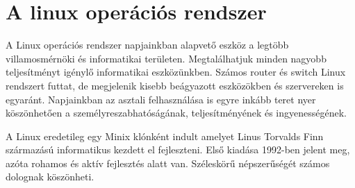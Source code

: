 \chapter{A linux operációs rendszer}

A Linux operációs rendszer napjainkban alapvető eszköz a legtöbb villamosmérnöki és informatikai területen. Megtalálhatjuk minden nagyobb teljesítményt igénylő informatikai eszközünkben. Számos router és switch Linux rendszert
futtat, de megjelenik kisebb beágyazott eszközökben és szervereken is egyaránt. Napjainkban az asztali felhasználása is egyre inkább teret nyer köszönhetően a személyreszabhatóságának, teljesítményének és ingyenességének.

A Linux eredetileg egy Minix klónként indult amelyet Linus Torvalds Finn származású informatikus kezdett el fejleszteni. Első kiadása 1992-ben jelent meg, azóta rohamos és aktív fejlesztés alatt van. 
Széleskörű népszerűségét számos dolognak köszönheti.


